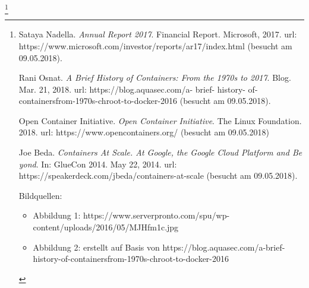 \let\thefootnote\relax\footnote{
{
\vspace{0.1mm}
\begin{minipage}[t]{\linewidth}
 \flushleft\begin{list}{\textcolor{black}{[]}}{\setlength{\labelwidth}{2cm}\setlength{\leftmargin}{0.5cm}\setlength{\itemsep}{-1mm}}\item Sataya Nadella. \textit{Annual Report 2017}. Financial Report. Microsoft, 2017. url: https://www.microsoft.com/investor/reports/ar17/index.html (besucht am 09.05.2018).
\item Rani Osnat. \textit{A Brief History of Containers: From the 1970s to 2017}. Blog. Mar. 21, 2018. url: https://blog.aquasec.com/a- brief- history- of- containersfrom-1970s-chroot-to-docker-2016 (besucht am 09.05.2018).
\item Open Container Initiative. \textit{Open Container Initiative}. The Linux Foundation. 2018. url: https://www.opencontainers.org/ (besucht am 09.05.2018)
\item Joe Beda. \textit{Containers At Scale. At Google, the Google Cloud Platform and Be
yond}. In: GlueCon 2014. May 22, 2014. url: https://speakerdeck.com/jbeda/containers-at-scale (besucht am 09.05.2018).
\end{list}
Bildquellen:
\begin{itemize}
\item Abbildung 1: https://www.serverpronto.com/spu/wp-content/uploads/2016/05/MJHfm1c.jpg
\item Abbildung 2: erstellt auf Basis von https://blog.aquasec.com/a-brief-history-of-containersfrom-1970s-chroot-to-docker-2016
\end{itemize}
\end{minipage}
}}
\newpage















